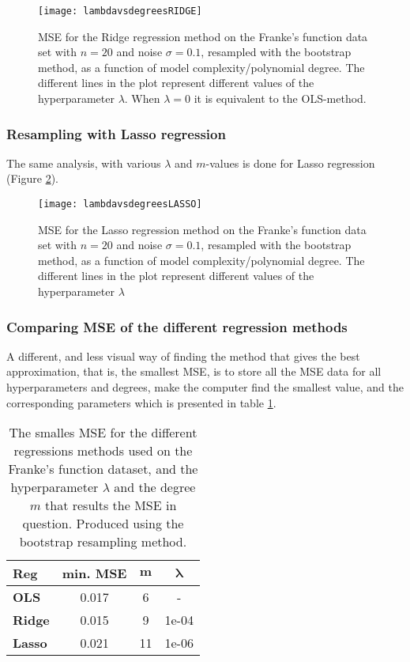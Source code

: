 \begin{figure}[htbp]
	\centering
	\texttt{[image: lambdavsdegreesRIDGE]}
	\caption{MSE for the Ridge regression method on the Franke's function data set with $n=20$ and noise $\sigma=0.1$, resampled with the bootstrap method, as a function of model complexity/polynomial degree. The different lines in the plot represent different values of the hyperparameter $\lambda$. When $\lambda=0$ it is equivalent to the OLS-method.}
	\label{fig:lambdavsdegreesRIDGE}
\end{figure}

\subsubsection{Resampling with Lasso regression}
The same analysis, with various $\lambda$ and $m$-values is done for Lasso regression (Figure \ref{fig:lambdavsdegreesLASSO}).
\begin{figure}[htbp]
	\centering
	\texttt{[image: lambdavsdegreesLASSO]}
	\caption{MSE for the Lasso regression method on the Franke's function data set with $n=20$ and noise $\sigma=0.1$, resampled with the bootstrap method, as a function of model complexity/polynomial degree. The different lines in the plot represent different values of the hyperparameter $\lambda$}
	\label{fig:lambdavsdegreesLASSO}
\end{figure}

\subsubsection{Comparing MSE of the different regression methods}
A different, and less visual way of finding the method that gives the best approximation, that is, the smallest MSE, is to store all the MSE data for all hyperparameters and degrees, make the computer find the smallest value, and the corresponding parameters which is presented in table \ref{tab:minerrorFRANKE}.
\begin{table}[htbp]
\caption{The smalles MSE for the different regressions methods used on the Franke's function dataset, and the hyperparameter $\lambda$ and the degree $m$ that results the MSE in question. Produced using the bootstrap resampling method.}
\centering
\begin{tabular}[width=0.5\textwidth]{lccc}
\hline
\textbf{Reg} & \textbf{min. MSE} & $\boldsymbol{m}$ & $\boldsymbol{\lambda}$ \\
\hline
\textbf{OLS} & 0.017 & 6 & - \\
\textbf{Ridge} & 0.015 & 9 & 1e-04 \\
\textbf{Lasso} & 0.021 & 11 & 1e-06
\end{tabular}
\label{tab:minerrorFRANKE}
\end{table}

